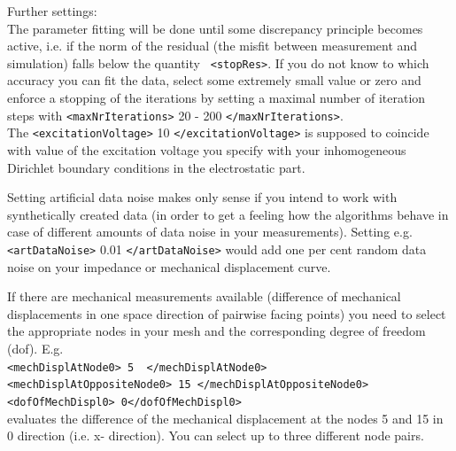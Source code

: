 \noindent Further settings: \\
The parameter fitting will be done until some discrepancy principle becomes active, i.e. if the norm of the residual (the misfit between measurement and simulation) falls below the quantity \verb! <stopRes>!. If you do not know to which accuracy you can fit the data, select some extremely small value or zero and enforce a stopping of the iterations by setting a maximal number of iteration steps with \verb!<maxNrIterations>! 20 - 200 \verb!</maxNrIterations>!.
\\ 
The \verb!<excitationVoltage>! 10 \verb!</excitationVoltage>! is supposed to coincide with value of the excitation voltage you specify with your inhomogeneous Dirichlet boundary conditions in the electrostatic part.

Setting artificial data noise makes only sense if you intend to work with synthetically created data (in order to get a feeling how the algorithms behave in case of different amounts of data noise in your measurements). Setting e.g. \verb!<artDataNoise>! 0.01 \verb!</artDataNoise>!
would add one per cent random data noise on your impedance or mechanical displacement curve. 

If there are mechanical measurements available (difference of mechanical displacements in one space direction of pairwise facing points) you need to select the appropriate nodes in your mesh and the corresponding degree of freedom (dof). E.g.  \\ \verb!<mechDisplAtNode0> 5  </mechDisplAtNode0> ! \\ \verb!<mechDisplAtOppositeNode0> 15 </mechDisplAtOppositeNode0> ! \\ \verb!<dofOfMechDispl0> 0</dofOfMechDispl0>!\\  evaluates the difference of the mechanical displacement at the nodes 5 and 15 in $0$ direction (i.e. x- direction). You can select up to three different node pairs.

